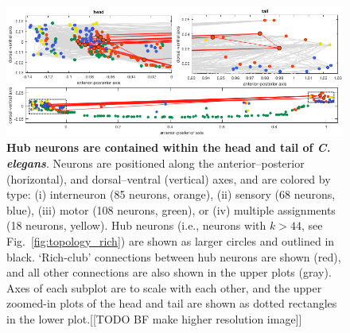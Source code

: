 \documentclass[10pt,letterpaper]{article}
\begin{document}

\begin{figure}[h]
\centering
    \includegraphics[width=1\textwidth]{SpatialPlot.png}
\caption{
\textbf{Hub neurons are contained within the head and tail of \emph{C. elegans}}.
Neurons are positioned along the anterior--posterior (horizontal), and dorsal--ventral (vertical) axes, and are colored by type:
(i) interneuron (85 neurons, orange),
(ii) sensory (68 neurons, blue),
(iii) motor (108 neurons, green), or
(iv) multiple assignments (18 neurons, yellow).
Hub neurons (i.e., neurons with $k > 44$, see Fig.~\ref{fig:topology_rich}) are shown as larger circles and outlined in black.
`Rich-club' connections between hub neurons are shown (red), and all other connections are also shown in the upper plots (gray).
Axes of each subplot are to scale with each other, and the upper zoomed-in plots of the head and tail are shown as dotted rectangles in the lower plot.[[TODO BF make higher resolution image]]
\label{fig:neuronsSpace}
}
\end{figure}
\end{document}
